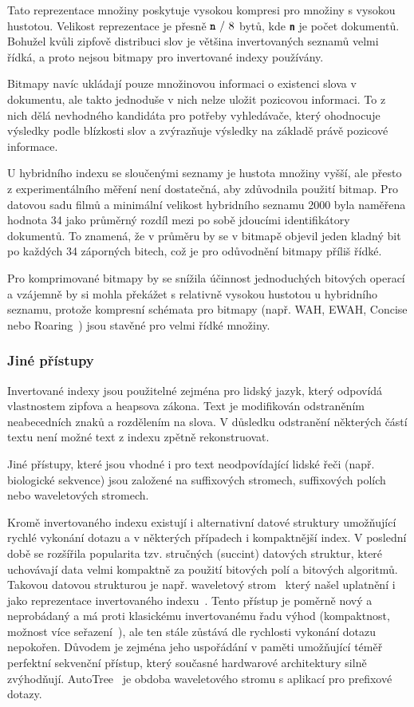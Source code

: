 \documentclass[11pt,letterpaper,oneside,openright]{book}
\newcommand{\bftt}[1]{\texttt{\textbf{#1}}}
\begin{document}
Tato reprezentace množiny poskytuje vysokou kompresi pro množiny s vysokou
hustotou. Velikost reprezentace je přesně $\bftt{n}\ /\ 8$ bytů, kde \bftt{n}
je počet dokumentů. Bohužel kvůli zipfově distribuci slov je většina
invertovaných seznamů velmi řídká, a proto nejsou bitmapy pro invertované
indexy používány.

Bitmapy navíc ukládají pouze množinovou informaci o existenci slova v
dokumentu, ale takto jednoduše v nich nelze uložit pozicovou informaci. To z
nich dělá nevhodného kandidáta pro potřeby vyhledávače, který ohodnocuje
výsledky podle blízkosti slov a zvýrazňuje výsledky na základě právě pozicové
informace.

U hybridního indexu se sloučenými seznamy je hustota množiny vyšší, ale přesto
z experimentálního měření není dostatečná, aby zdůvodnila použití bitmap. Pro
datovou sadu filmů a minimální velikost hybridního seznamu 2000 byla naměřena
hodnota 34 jako průměrný rozdíl mezi po sobě jdoucími identifikátory dokumentů.
To znamená, že v průměru by se v bitmapě objevil jeden kladný bit po každých 34
záporných bitech, což je pro odůvodnění bitmapy příliš řídké.

Pro komprimované bitmapy by se snížila účinnost jednoduchých bitových operací a
vzájemně by si mohla překážet s relativně vysokou hustotou u hybridního
seznamu, protože kompresní schémata pro bitmapy (např. WAH, EWAH, Concise nebo
Roaring~\cite{DBLP:journals/corr/LemireKK16}) jsou stavěné pro velmi řídké
množiny.

\subsubsection{Jiné přístupy}
Invertované indexy jsou použitelné zejména pro lidský jazyk, který odpovídá
vlastnostem zipfova a heapsova zákona. Text je modifikován odstraněním
neabecedních znaků a rozdělením na slova. V důsledku odstranění některých částí
textu není možné text z indexu zpětně rekonstruovat.

Jiné přístupy, které jsou vhodné i pro text neodpovídající lidské řeči (např.
biologické sekvence) jsou založené na suffixových stromech, suffixových polích
nebo waveletových stromech.

Kromě invertovaného indexu existují i alternativní datové struktury umožňující
rychlé vykonání dotazu a v některých případech i kompaktnější index. V poslední
době se rozšířila popularita tzv. stručných (succint) datových struktur, které
uchovávají data velmi kompaktně za použití bitových polí a bitových algoritmů.
Takovou datovou strukturou je např. waveletový
strom~\cite{Grossi:2003:HET:644108.644250} který našel uplatnění i jako
reprezentace invertovaného
indexu~\cite{Ferragina:2007:CRS:1240233.1240243,FERRAGINA2009849}. Tento
přístup je poměrně nový a neprobádaný a má proti klasickému invertovanému řadu
výhod (kompaktnost, možnost více seřazení~\cite{Navarro2010}), ale ten stále
zůstává dle rychlosti vykonání dotazu nepokořen. Důvodem je zejména jeho
uspořádání v paměti umožňující téměř perfektní sekvenční přístup, který
současné hardwarové architektury silně zvýhodňují. AutoTree~\cite{Weber2007} je
obdoba waveletového stromu s aplikací pro prefixové dotazy.
\end{document}
